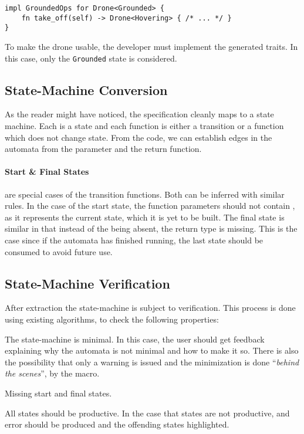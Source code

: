 \begin{listing}
    \centering
    \begin{verbatim}
impl GroundedOps for Drone<Grounded> {
    fn take_off(self) -> Drone<Hovering> { /* ... */ }
}
    \end{verbatim}
    \caption{
        To make the drone usable, the developer must implement the generated traits.
        In this case, only the \texttt{Grounded} state is considered.
    }
    \label{lst:dsl-typestate-impl}
\end{listing}

\subsection{State-Machine Conversion}
As the reader might have noticed, the specification cleanly maps to a state machine.
Each  is a state and each function is either a transition or a function which does not change state.
From the code, we can establish edges in the automata from the  parameter and the return function.

\paragraph{Start \& Final States} are special cases of the transition functions.
Both can be inferred with similar rules. In the case of the start state, the function parameters should not contain ,
as it represents the current state, which it is yet to be built.
The final state is similar in that instead of the  being absent, the return type is missing.
This is the case since if the automata has finished running, the last state should be consumed to avoid future use.

\subsection{State-Machine Verification}\label{sec:arch:fsm-verification}
After extraction the state-machine is subject to verification.
This process is done using existing algorithms, to check the following properties:
\begin{compactitem}
    \item The state-machine is minimal. In this case, the user should get feedback explaining why the automata is not minimal and how to make it so.
    There is also the possibility that only a warning is issued and the minimization is done “\emph{behind the scenes}”, by the macro.
    \item Missing start and final states.
    \item All states should be productive. In the case that states are not productive, and error should be produced and the offending states highlighted.
\end{compactitem}

